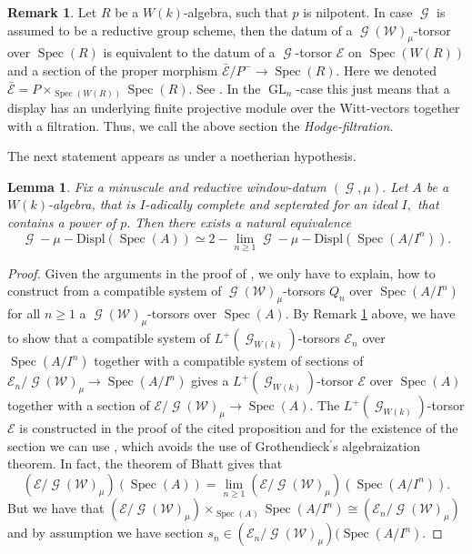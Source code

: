 \documentclass[a4paper,10,5 pt]{amsart}
\newtheorem{Lemma}[Satz]{Lemma}
\theoremstyle{definition}
\newtheorem{Remark}{Remark}
\DeclareMathOperator{\Spec}{Spec}
\DeclareMathOperator{\GL}{GL}
\DeclareMathOperator{\G}{\mathcal{G}}
\begin{document}
\begin{Remark}\label{Remark zur Hodge-Filtration}
Let $R$ be a $W(k)$-algebra, such that $p$ is nilpotent.
In case $\G$ is assumed to be a reductive group scheme, then the datum of a $\G(\mathcal{W})_{\mu}$-torsor over $\Spec(R)$ is equivalent to the datum of a $\G$-torsor $\mathcal{E}$ on $\Spec(W(R))$ and a section of the proper morphism $\bar{\mathcal{E}}/P^{-}\rightarrow \Spec(R)$. Here we denoted $\bar{\mathcal{E}}=P\times_{\Spec(W(R))} \Spec(R).$ See \cite[3.2.4.]{BP}. In the $\GL_{n}$-case this just means that a display has an underlying finite projective module over the Witt-vectors together with a filtration. Thus, we call the above section the \textit{Hodge-filtration}.
\end{Remark}
The next statement appears as \cite[Prop. 3.2.11.]{BP} under a noetherian hypothesis.
\begin{Lemma}\label{Displays ueber adischen Ringen}
 Fix a minuscule and reductive window-datum $(\G,\mu).$
Let $A$ be a $W(k)$-algebra, that is $I$-adically complete and septerated for an ideal $I,$ that contains a power of $p.$ Then there exists a natural equivalence
$$\G-\mu-\text{Displ}(\Spec(A)) \simeq 2-\lim_{n\geq 1} \G-\mu-\text{Displ}(\Spec(A/I^{n})).$$
\end{Lemma}
\begin{proof}
Given the arguments in the proof of \cite[Prop. 3.2.11.]{BP}, we only have to explain, how to construct from a compatible system of $\G(\mathcal{W})_{\mu}$-torsors $Q_{n}$ over $\Spec(A/I^{n})$ for all $n\geq 1$ a $\G(\mathcal{W})_{\mu}$-torsors over $\Spec(A).$ By Remark \ref{Remark zur Hodge-Filtration} above, we have to show that a compatible system of $L^{+}(\G_{W(k)})$-torsors $\mathcal{E}_{n}$ over $\Spec(A/I^{n})$ together with a compatible system of sections of $\mathcal{E}_{n}/\G(\mathcal{W})_{\mu}\rightarrow \Spec(A/I^{n})$ gives a $L^{+}(\G_{W(k)})$-torsor $\mathcal{E}$ over $\Spec(A)$ together with a section of $\mathcal{E}/\G(\mathcal{W})_{\mu}\rightarrow \Spec(A).$ The $L^{+}(\G_{W(k)})$-torsor $\mathcal{E}$ is constructed in the proof of the cited proposition and for the existence of the section we can use \cite[Remark 4.6.]{Bhatt}, which avoids the use of Grothendieck$^{\prime}$s algebraization theorem. In fact, the theorem of Bhatt gives that
$$(\mathcal{E}/\G(\mathcal{W})_{\mu})(\Spec(A))=\lim_{n\geq 1} (\mathcal{E}/\G(\mathcal{W})_{\mu})(\Spec(A/I^{n})).$$
But we have that $(\mathcal{E}/\G(\mathcal{W})_{\mu})\times_{\Spec(A)} \Spec(A/I^{n})\cong (\mathcal{E}_{n}/\G(\mathcal{W})_{\mu})$ and by assumption we have section $s_{n}\in (\mathcal{E}_{n}/\G(\mathcal{W})_{\mu})(\Spec(A/I^{n}).$
\end{proof}
\end{document}

